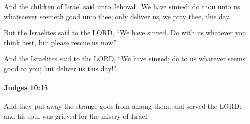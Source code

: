 			\begin{versebox}
					\item[BHS] 
					\item[ASV] And the children of Israel said unto Jehovah, We have sinned: do thou unto us whatsoever seemeth good unto thee; only deliver us, we pray thee, this day.
					\item[NIV] But the Israelites said to the LORD, “We have sinned. Do with us whatever you think best, but please rescue us now.”
					\item[NRSV] And the Israelites said to the LORD, “We have sinned; do to us whatever seems good to you; but deliver us this day!”
			\end{versebox}

		\paragraph{Judges 10:16} %
			\label{JUDGES-10-16}

			And they put away the strange gods from among them, and served the LORD: and his soul was grieved for the misery of Israel.

